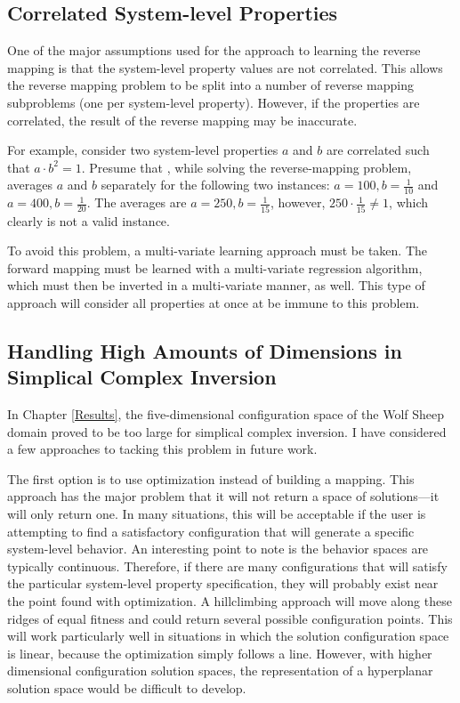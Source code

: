 
\subsection{Correlated System-level Properties}

One of the major assumptions used for the \fw approach to learning the reverse mapping is that the system-level property values are not correlated.
This allows the reverse mapping problem to be split into a number of reverse mapping subproblems (one per system-level property).
However, if the properties are correlated, the result of the reverse mapping may be inaccurate.

For example, consider two system-level properties $a$ and $b$ are correlated such that $a \cdot b^2 = 1$.
Presume that \fw, while solving the reverse-mapping problem, averages $a$ and $b$ separately for the following two instances: $a=100, b=\frac{1}{10}$ and $a=400, b=\frac{1}{20}$.
The averages are $a=250, b=\frac{1}{15}$, however, $250 \cdot \frac{1}{15} \neq 1$, which clearly is not a valid instance.

To avoid this problem, a multi-variate learning approach must be taken.
The forward mapping must be learned with a multi-variate regression algorithm, which must then be inverted in a multi-variate manner, as well.
This type of approach will consider all properties at once at be immune to this problem.



\subsection{Handling High Amounts of Dimensions in Simplical Complex Inversion}

In Chapter \ref{Results}, the five-dimensional configuration space of the Wolf Sheep domain proved to be too large for simplical complex inversion.
I have considered a few approaches to tacking this problem in future work.

The first option is to use optimization instead of building a mapping.
This approach has the major problem that it will not return a space of solutions---it will only return one.
In many situations, this will be acceptable if the user is attempting to find a satisfactory configuration that will generate a specific system-level behavior.
An interesting point to note is the behavior spaces are typically continuous.
Therefore, if there are many configurations that will satisfy the particular system-level property specification, they will probably exist near the point found with optimization.
A hillclimbing approach will move along these ridges of equal fitness and could return several possible configuration points.
This will work particularly well in situations in which the solution configuration space is linear, because the optimization simply follows a line.
However, with higher dimensional configuration solution spaces, the representation of a hyperplanar solution space would be difficult to develop. 

